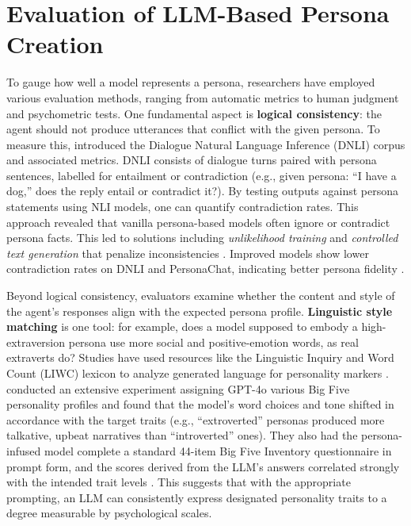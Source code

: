 \section{Evaluation of LLM-Based Persona Creation}
To gauge how well a model represents a persona, researchers have employed various evaluation methods, ranging from automatic metrics to human judgment and psychometric tests. One fundamental aspect is \textbf{logical consistency}: the agent should not produce utterances that conflict with the given persona. To measure this, \citet{welleck-etal-2019-dialogueNLI} introduced the Dialogue Natural Language Inference (DNLI) corpus and associated metrics. DNLI consists of dialogue turns paired with persona sentences, labelled for entailment or contradiction (e.g., given persona: “I have a dog,” does the reply entail or contradict it?). By testing outputs against persona statements using NLI models, one can quantify contradiction rates. This approach revealed that vanilla persona-based models often ignore or contradict persona facts. This led to solutions including \emph{unlikelihood training} and \emph{controlled text generation} that penalize inconsistencies \cite{li-etal-2020-dont, kim-etal-2020-will}. Improved models show lower contradiction rates on DNLI and PersonaChat, indicating better persona fidelity \cite{kim-etal-2020-will}.

Beyond logical consistency, evaluators examine whether the content and style of the agent's responses align with the expected persona profile. \textbf{Linguistic style matching} is one tool: for example, does a model supposed to embody a high-extraversion persona use more social and positive-emotion words, as real extraverts do? Studies have used resources like the Linguistic Inquiry and Word Count (LIWC) lexicon to analyze generated language for personality markers \cite{jiang-etal-2023-personallm}. \citet{jiang-etal-2023-personallm} conducted an extensive experiment assigning GPT-4o various Big Five personality profiles and found that the model’s word choices and tone shifted in accordance with the target traits (e.g., “extroverted” personas produced more talkative, upbeat narratives than “introverted” ones). They also had the persona-infused model complete a standard 44-item Big Five Inventory questionnaire in prompt form, and the scores derived from the LLM’s answers correlated strongly with the intended trait levels \cite{jiang-etal-2023-personallm}. This suggests that with the appropriate prompting, an LLM can consistently express designated personality traits to a degree measurable by psychological scales.

